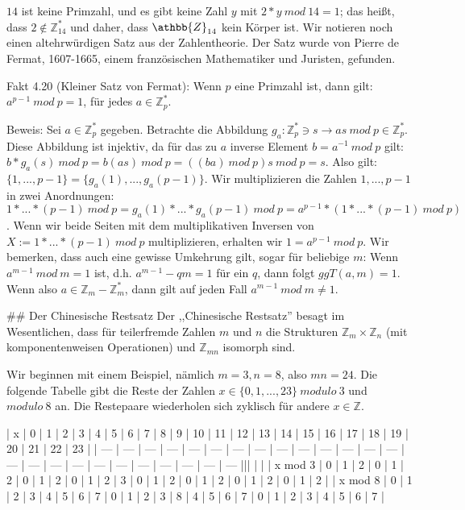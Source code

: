 \documentclass[a4paper]{article}
\begin{document}
\begin{multicols}{3}
    $14$ ist keine Primzahl, und es gibt keine Zahl $y$ mit $2*y\ mod\ 14 = 1$; das heißt, dass $2\not\in\mathbb{Z}^*_{14}$ und daher, dass $\athbb{Z}_{14}$ kein Körper ist.
    Wir notieren noch einen altehrwürdigen Satz aus der Zahlentheorie. Der Satz wurde von Pierre de Fermat, 1607-1665, einem französischen Mathematiker und Juristen, gefunden.

    Fakt 4.20 (Kleiner Satz von Fermat): Wenn $p$ eine Primzahl ist, dann gilt: $a^{p-1}\ mod\ p= 1$, für jedes $a\in\mathbb{Z}^*_p$.

    Beweis: Sei $a\in\mathbb{Z}^*_p$ gegeben. Betrachte die Abbildung $g_a: \mathbb{Z}^*_p \owns s\rightarrow as\ mod\ p\in\mathbb{Z}^*_p$. Diese Abbildung ist injektiv, da für das zu $a$ inverse Element $b=a^{-1}\ mod\ p$ gilt: $b*g_a(s)\ mod\ p=b(as)\ mod\ p=((ba)\ mod\ p)s\ mod\ p=s$. Also gilt: $\{1,...,p-1\}=\{g_a(1),...,g_a(p-1)\}$.
    Wir multiplizieren die Zahlen $1,...,p-1$ in zwei Anordnungen: $1*...*(p-1)\ mod\ p =g_a(1) *...*g_a(p-1)\ mod\ p=a^{p-1} *(1*...*(p-1)\ mod\ p)$.
    Wenn wir beide Seiten mit dem multiplikativen Inversen von $X:= 1*...*(p-1)\ mod\ p$ multiplizieren, erhalten wir $1=a^{p-1}\ mod\ p$.
    Wir bemerken, dass auch eine gewisse Umkehrung gilt, sogar für beliebige $m$: Wenn $a^{m-1}\ mod\ m=1$ ist, d.h. $a^{m-1}-qm=1$ für ein $q$, dann folgt $ggT(a,m)=1$. Wenn also $a\in\mathbb{Z}_m -\mathbb{Z}^*_m$, dann gilt auf jeden Fall $a^{m-1}\ mod\ m\not= 1$.

    ## Der Chinesische Restsatz
    Der ,,Chinesische Restsatz'' besagt im Wesentlichen, dass für teilerfremde Zahlen $m$ und $n$ die Strukturen $\mathbb{Z}_m \times\mathbb{Z}_n$ (mit komponentenweisen Operationen) und $\mathbb{Z}_{mn}$ isomorph sind.

    Wir beginnen mit einem Beispiel, nämlich $m=3,n=8$, also $mn=24$. Die folgende Tabelle gibt die Reste der Zahlen $x\in\{0,1,...,23\}\ modulo\ 3$ und $modulo\ 8$ an. Die Restepaare wiederholen sich zyklisch für andere $x\in\mathbb{Z}$.

    | x   | 0   | 1   | 2   | 3   | 4   | 5   | 6   | 7   | 8   | 9   | 10  | 11  | 12  | 13  | 14  | 15  | 16  | 17  | 18  | 19  | 20  | 21  | 22  | 23  |
    | --- | --- | --- | --- | --- | --- | --- | --- | --- | --- | --- | --- | --- | --- | --- | --- | --- | --- | --- | --- | --- | --- | --- | --- | --- |||  |  |
    | x mod 3 | 0   | 1   | 2   | 0   | 1   | 2   | 0   | 1   | 2   | 0   | 1   | 2   | 3   | 0   | 1   | 2   | 0   | 1   | 2   | 0   | 1   | 2   | 0   | 1   | 2   |
    | x mod 8 | 0   | 1   | 2   | 3   | 4   | 5   | 6   | 7   | 0   | 1   | 2   | 3   | 8   | 4   | 5   | 6   | 7   | 0   | 1   | 2   | 3   | 4   | 5   | 6   | 7   |


\end{multicols}
\end{document}
